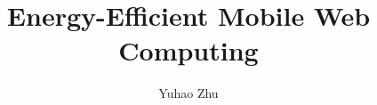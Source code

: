\documentclass[12pt]{report}	%
\author{Yuhao Zhu}  	%
\title{Energy-Efficient Mobile Web Computing}   %
\theoremstyle{definition}
\theoremstyle{remark}
\begin{document}
\copyrightpage          %


%
%
%
\commcertpage           %

\titlepage              %


\graphicspath{{figs/}}






\tableofcontents   %

\listoftables      %
\listoffigures     %


%
%









%
%

%
%
%
\end{document}
